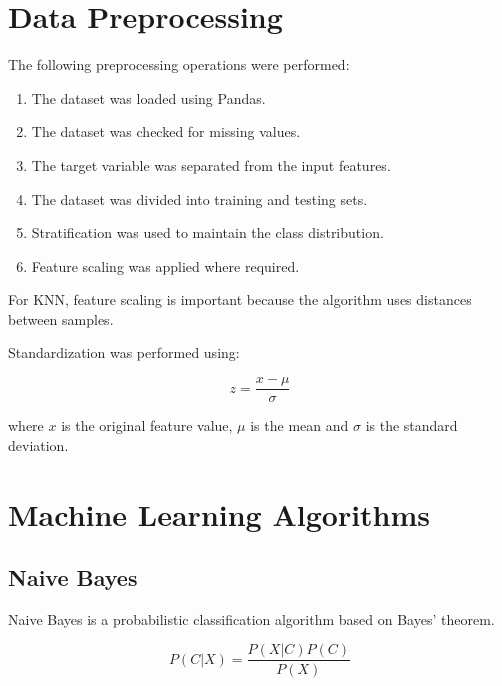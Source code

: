 \documentclass[12pt,a4paper]{article}
\begin{document}

\section{Data Preprocessing}

The following preprocessing operations were performed:

\begin{enumerate}
    \item The dataset was loaded using Pandas.
    \item The dataset was checked for missing values.
    \item The target variable was separated from the input features.
    \item The dataset was divided into training and testing sets.
    \item Stratification was used to maintain the class distribution.
    \item Feature scaling was applied where required.
\end{enumerate}

For KNN, feature scaling is important because the algorithm uses distances between samples.

Standardization was performed using:

\[
z = \frac{x-\mu}{\sigma}
\]

where $x$ is the original feature value, $\mu$ is the mean and $\sigma$ is the standard deviation.


\section{Machine Learning Algorithms}


\subsection{Naive Bayes}

Naive Bayes is a probabilistic classification algorithm based on Bayes' theorem.

\[
P(C|X)=\frac{P(X|C)P(C)}{P(X)}
\]
\end{document}
